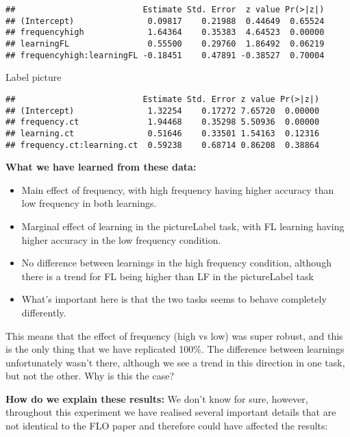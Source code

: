 \documentclass[
]{article}
\begin{document}
\begin{verbatim}
##                          Estimate Std. Error  z value Pr(>|z|)
## (Intercept)               0.09817    0.21988  0.44649  0.65524
## frequencyhigh             1.64364    0.35383  4.64523  0.00000
## learningFL                0.55500    0.29760  1.86492  0.06219
## frequencyhigh:learningFL -0.18451    0.47891 -0.38527  0.70004
\end{verbatim}

Label picture

\begin{verbatim}
##                          Estimate Std. Error z value Pr(>|z|)
## (Intercept)               1.32254    0.17272 7.65720  0.00000
## frequency.ct              1.94468    0.35298 5.50936  0.00000
## learning.ct               0.51646    0.33501 1.54163  0.12316
## frequency.ct:learning.ct  0.59238    0.68714 0.86208  0.38864
\end{verbatim}

\textbf{What we have learned from these data:}

\begin{itemize}
\item
  Main effect of frequency, with high frequency having higher accuracy
  than low frequency in both learnings.
\item
  Marginal effect of learning in the pictureLabel task, with FL learning
  having higher accuracy in the low frequency condition.
\item
  No difference between learnings in the high frequency condition,
  although there is a trend for FL being higher than LF in the
  pictureLabel task
\item
  What's important here is that the two tasks seems to behave completely
  differently.
\end{itemize}

This means that the effect of frequency (high vs low) was super robust,
and this is the only thing that we have replicated 100\%. The difference
between learnings unfortunately wasn't there, although we see a trend in
this direction in one task, but not the other. Why is this the case?

\textbf{How do we explain these results:} We don't know for sure,
however, throughout this experiment we have realised several important
details that are not identical to the FLO paper and therefore could have
affected the results:
\end{document}
